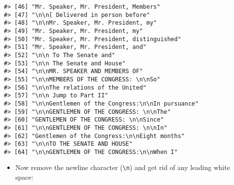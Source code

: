 \documentclass[]{book}
\newenvironment{Shaded}{\begin{snugshade}}{\end{snugshade}}
\newcommand{\CharTok}[1]{\textcolor[rgb]{0.31,0.60,0.02}{#1}}
\newcommand{\DataTypeTok}[1]{\textcolor[rgb]{0.13,0.29,0.53}{#1}}
\newcommand{\DecValTok}[1]{\textcolor[rgb]{0.00,0.00,0.81}{#1}}
\newcommand{\KeywordTok}[1]{\textcolor[rgb]{0.13,0.29,0.53}{\textbf{#1}}}
\newcommand{\NormalTok}[1]{#1}
\newcommand{\OperatorTok}[1]{\textcolor[rgb]{0.81,0.36,0.00}{\textbf{#1}}}
\newcommand{\StringTok}[1]{\textcolor[rgb]{0.31,0.60,0.02}{#1}}
\providecommand{\tightlist}{%
  \setlength{\itemsep}{0pt}\setlength{\parskip}{0pt}}
\begin{document}
\begin{verbatim}
#> [46] "Mr. Speaker, Mr. President, Members"           
#> [47] "\n\n[ Delivered in person before"              
#> [48] "\n\nMr. Speaker, Mr. President, my"            
#> [49] "Mr. Speaker, Mr. President, my"                
#> [50] "Mr. Speaker, Mr. President, distinguished"     
#> [51] "Mr. Speaker, Mr. President, and"               
#> [52] "\n\n To The Senate and"                        
#> [53] "\n\n The Senate and House"                     
#> [54] "\n\nMR. SPEAKER AND MEMBERS OF"                
#> [55] "\n\nMEMBERS OF THE CONGRESS: \n\nSo"           
#> [56] "\n\nThe relations of the United"               
#> [57] "\n\n Jump to Part II"                          
#> [58] "\n\nGentlemen of the Congress:\n\nIn pursuance"
#> [59] "\n\nGENTLEMEN OF THE CONGRESS: \n\nThe"        
#> [60] "GENTLEMEN OF THE CONGRESS: \n\nSince"          
#> [61] "\n\nGENTLEMEN OF THE CONGRESS: \n\nIn"         
#> [62] "Gentlemen of the Congress:\n\nEight months"    
#> [63] "\n\nTO THE SENATE AND HOUSE"                   
#> [64] "\n\nGENTLEMEN OF THE CONGRESS:\n\nWhen I"
\end{verbatim}

\begin{itemize}
\tightlist
\item
  Now remove the newline character (\texttt{\textbackslash{}n}) and get rid of any leading white space:
\end{itemize}

\begin{Shaded}
\end{Shaded}
\end{document}
